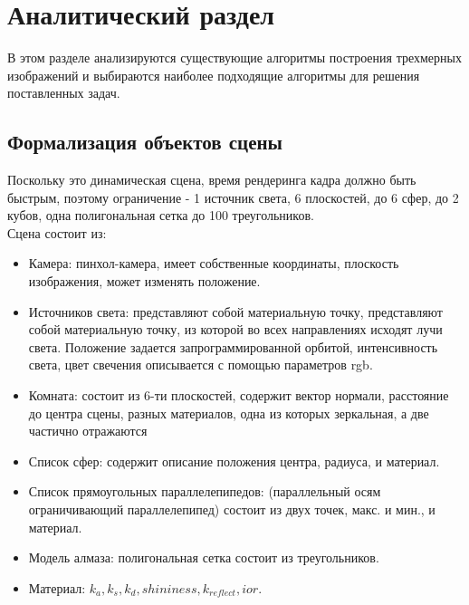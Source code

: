 \chapter{Аналитический раздел}
\label{cha:analysis}

В этом разделе анализируются существующие алгоритмы построения трехмерных изображений
и выбираются наиболее подходящие алгоритмы для решения поставленных задач.

\section{Формализация объектов сцены}


Поскольку это динамическая сцена, время рендеринга кадра должно быть быстрым,
поэтому ограничение - 1 источник света, 6 плоскостей, до 6 сфер, до 2 кубов, одна полигональная сетка до 100 треугольников.
\\

Сцена состоит из:

\begin{itemize}

  \item Камера: пинхол-камера, имеет собственные координаты, плоскость изображения, может изменять положение.
  \item Источников света: представляют собой материальную точку,
  представляют собой материальную точку, из которой во всех направлениях исходят лучи света.
  Положение задается запрограммированной орбитой,
  интенсивность света, цвет свечения описывается с помощью параметров rgb.
  \item Комната: состоит из 6-ти плоскостей, содержит вектор нормали, расстояние до центра сцены,
  разных материалов, одна из которых зеркальная, а две частично отражаются
  \item Список сфер: содержит описание положения центра, радиуса, и материал.
  \item Список прямоугольных параллелепипедов: (параллельный осям ограничивающий параллелепипед)
  состоит из двух точек, макс. и мин., и материал.
  \item Модель алмаза: полигональная сетка состоит из треугольников.
  \item Материал: $k_a, k_s, k_d, shininess, k_{reflect}, ior$.
\end{itemize}



